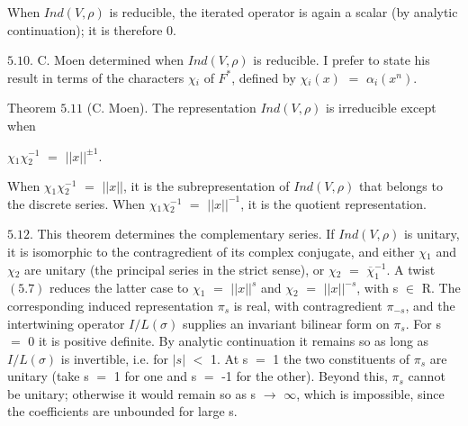 \documentclass[10pt,a4paper]{article}
\begin{document}
\clearpage
{}
\label{d035-physical-025}
\par When $Ind(V,\rho{})$ is reducible, the iterated operator is again a scalar (by analytic continuation); it is therefore 0.\par
\par $5.10$. C. Moen determined when $Ind(V,\rho{})$ is reducible. I prefer to state his result in terms of the characters $\chi{}_i$ of $F^*$, defined by $\chi{}_i(x)$ $=$ $\alpha{}_i(x^n)$.\par
\par Theorem $5.11$ (C. Moen). The representation $Ind(V,\rho{})$ is irreducible except when\par
\par\smallskip\begin{center}\begin{minipage}{0.96\textwidth}\centering
$\chi{}_1\chi{}_2^{-1}$ $=$ $||x||^{\pm{}1}$.
\end{minipage}\end{center}\smallskip
\par When $\chi{}_1\chi{}_2^{-1}$ $=$ $||x||$, it is the subrepresentation of $Ind(V,\rho{})$ that belongs to the discrete series. When $\chi{}_1\chi{}_2^{-1}$ $=$ $||x||^{-1}$, it is the quotient representation.\par
\par $5.12$. This theorem determines the complementary series. If $Ind(V,\rho{})$ is unitary, it is isomorphic to the contragredient of its complex conjugate, and either $\chi{}_1$ and $\chi{}_2$ are unitary (the principal series in the strict sense), or $\chi{}_2$ $=$ $\overline{\chi{}}_1^{-1}$. A twist $(5.7)$ reduces the latter case to $\chi{}_1$ $=$ $||x||^s$ and $\chi{}_2$ $=$ $||x||^{-s}$, with s $\in{}$ R. The corresponding induced representation $\pi{}_s$ is real, with contragredient $\pi{}_{-s}$, and the intertwining operator $I/L(\sigma{})$ supplies an invariant bilinear form on $\pi{}_s$. For s $=$ 0 it is positive definite. By analytic continuation it remains so as long as $I/L(\sigma{})$ is invertible, i.e. for $|s|$ $<$ 1. At s $=$ 1 the two constituents of $\pi{}_s$ are unitary (take s $=$ 1 for one and s $=$ -1 for the other). Beyond this, $\pi{}_s$ cannot be unitary; otherwise it would remain so as s $\to{}$ $\infty{}$, which is impossible, since the coefficients are unbounded for large s.\par
\end{document}
